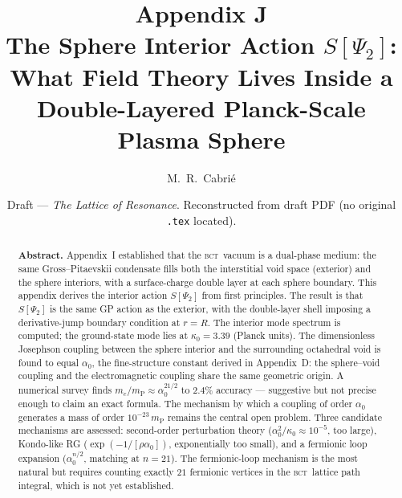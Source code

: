 \documentclass[aps,prl,preprint,superscriptaddress,floatfix]{revtex4-2}
\newcommand{\az}{\alpha_0}
\newcommand{\mP}{m_{\mathrm{P}}}
\newcommand{\BCT}{\textsc{bct}}
\newcommand{\Psiint}{\Psi_2}
\newcommand{\Rsph}{R}
\begin{document}
\title{%
  Appendix J\\
  The Sphere Interior Action $S[\Psiint]$:\\
  What Field Theory Lives Inside a Double-Layered
  Planck-Scale Plasma Sphere}

\author{M.~R.~Cabri\'{e}}

\date{Draft --- \textit{The Lattice of Resonance}. Reconstructed from draft PDF (no original \texttt{.tex} located).}

\begin{abstract}
\textbf{Abstract.}
Appendix~I established that the \BCT\ vacuum is a dual-phase medium: the same
Gross--Pitaevskii condensate fills both the interstitial void space (exterior)
and the sphere interiors, with a surface-charge double layer at each sphere
boundary. This appendix derives the interior action $S[\Psiint]$ from first
principles. The result is that $S[\Psiint]$ is the same GP action as the
exterior, with the double-layer shell imposing a derivative-jump boundary
condition at $r=\Rsph$. The interior mode spectrum is computed; the ground-state
mode lies at $\kappa_0 = 3.39$ (Planck units). The dimensionless Josephson
coupling between the sphere interior and the surrounding octahedral void is
found to equal $\az$, the fine-structure constant derived in Appendix~D: the
sphere--void coupling and the electromagnetic coupling share the same geometric
origin. A numerical survey finds $m_e/\mP \approx \az^{21/2}$ to $2.4\%$
accuracy --- suggestive but not precise enough to claim an exact formula. The
mechanism by which a coupling of order $\az$ generates a mass of order
$10^{-23}\,\mP$ remains the central open problem. Three candidate mechanisms are
assessed: second-order perturbation theory ($\az^2/\kappa_0 \approx 10^{-5}$,
too large), Kondo-like RG ($\exp(-1/[\rho\az])$, exponentially too small), and a
fermionic loop expansion ($\az^{n/2}$, matching at $n=21$). The fermionic-loop
mechanism is the most natural but requires counting exactly $21$ fermionic
vertices in the \BCT\ lattice path integral, which is not yet established.
\end{abstract}

\maketitle

\tableofcontents
\end{document}
